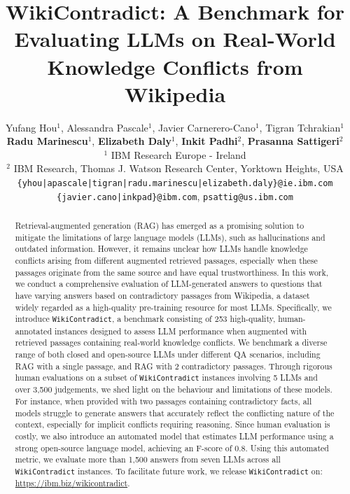 \documentclass{article}
\title{WikiContradict: A Benchmark for Evaluating LLMs on Real-World Knowledge Conflicts from Wikipedia}
\author{Yufang Hou$^{1}$, Alessandra Pascale$^{1}$, Javier Carnerero-Cano$^{1}$, Tigran Tchrakian$^{1}$ \\ \textbf{Radu Marinescu}$^{1}$, \textbf{Elizabeth Daly}$^{1}$, \textbf{Inkit Padhi}$^{2}$, \textbf{Prasanna Sattigeri}$^{2}$ \\
$^{1}$ IBM Research Europe - Ireland \\
$^{2}$ IBM Research, Thomas J. Watson Research Center, Yorktown Heights, USA\\
\texttt{\{yhou|apascale|tigran|radu.marinescu|elizabeth.daly\}@ie.ibm.com}   \\
\texttt{\{javier.cano|inkpad\}@ibm.com}, \texttt{psattig@us.ibm.com} 
}
\begin{document}
\maketitle

\begin{abstract}
Retrieval-augmented generation (RAG) has emerged as a promising solution to mitigate the limitations of large language models (LLMs), such as hallucinations and outdated information. However, it remains unclear how LLMs handle knowledge conflicts arising from different augmented retrieved passages, especially when these passages originate from the same source and have equal trustworthiness. In this work, we conduct a comprehensive evaluation of LLM-generated answers to questions that have varying answers based on contradictory passages from Wikipedia, a dataset widely regarded as a high-quality pre-training resource for most LLMs. Specifically, we introduce \texttt{WikiContradict}, a benchmark consisting of 253 high-quality, human-annotated instances designed to assess LLM performance when augmented with retrieved passages containing real-world knowledge conflicts. We benchmark a diverse range of both closed and open-source LLMs under different QA scenarios, including RAG with a single  passage, and RAG with 2 contradictory passages. Through rigorous human evaluations on a subset of \texttt{WikiContradict} instances involving 5 LLMs and over 3,500 judgements, we shed light on the behaviour and limitations of these models. For instance, when provided with two passages containing contradictory facts, all models struggle to generate answers that accurately reflect the conflicting nature of the context, especially for implicit conflicts requiring reasoning. Since human evaluation is costly, we
also introduce an automated model that estimates LLM performance using a strong open-source
language model, achieving an F-score of 0.8. Using this automated metric, we evaluate more than 1,500 answers from seven LLMs across all \texttt{WikiContradict} instances.
To facilitate future work, we release \texttt{WikiContradict} on: \url{https://ibm.biz/wikicontradict}.
\end{abstract}













\newpage
\end{document}
